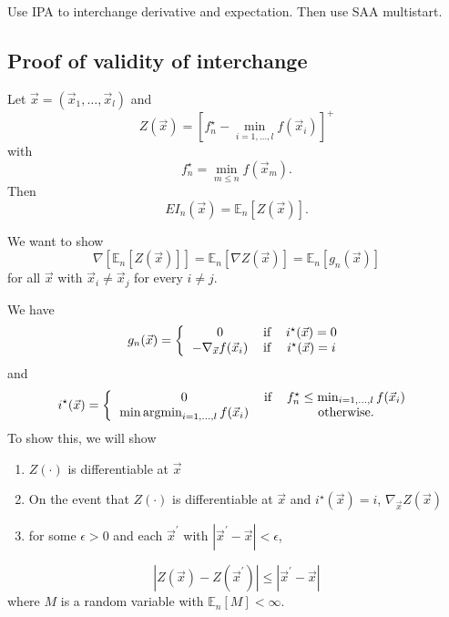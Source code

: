 \documentclass[phd,tocprelim]{cornell}
\DeclareMathOperator*{\argmin}{argmin}
\begin{document}
Use IPA to interchange derivative and expectation. Then use SAA multistart.

\subsection{Proof of validity of interchange}

Let $\vec{x} = \left(\vec{x}_{1}, \ldots, \vec{x}_{l}\right)$ and
\begin{equation}
    Z \left(\vec{x}\right) = \left[f_{n}^{\star} - \min_{i = 1,\ldots,l} f \left(\vec{x}_{i}\right)\right]^{+}
\end{equation}
with
\begin{equation}
    f_{n}^{\star} = \min_{m\leq n} f \left(\vec{x}_{m}\right).
\end{equation}
Then
\begin{equation}
    EI_{n}(\vec{x}) = \mathbb{E}_{n}\left[Z \left(\vec{x}\right)\right].
\end{equation}

We want to show
\begin{equation}
    \nabla \left[\mathbb{E}_{n}\left[Z \left(\vec{x}\right)\right]\right] = \mathbb{E}_{n}\left[\nabla Z \left(\vec{x}\right)\right] =  \mathbb{E}_{n}\left[g_{n}(\vec{x})\right]
\end{equation}
for all $\vec{x}$ with $\vec{x}_{i} \neq \vec{x}_{j}$ for every $i \neq j$.

We have
\begin{equation}
    g_{n}(\vec{x}) = \left\{ \begin{tabular}{ccc}
        0 & if & $i^{\star}(\vec{x}) = 0$ \\
        $-\nabla_{\vec{x}} f(\vec{x}_{i})$ & if & $i^{\star}(\vec{x}) = i$
    \end{tabular} \right.
\end{equation}
and
\begin{equation}
    i^{\star}(\vec{x}) = \left\{ \begin{tabular}{ccc}
        0 & if & $f_{n}^{\star} \leq \min_{i=1,\ldots,l} f(\vec{x}_{i})$ \\
        $\min \argmin_{i=1,\ldots,l} f(\vec{x}_{i})$ & & otherwise.
    \end{tabular} \right.
\end{equation}
To show this, we will show
\begin{enumerate}
    \item $Z(\cdot)$ is differentiable at $\vec{x}$
    \item On the event that $Z(\cdot)$ is differentiable at $\vec{x}$ and $i^{\star}(\vec{x}) = i$, $\nabla_{\vec{x}} Z(\vec{x})$
    \item for some $\epsilon > 0$ and each $\vec{x}^{\prime}$ with $|\vec{x}^{\prime} - \vec{x}| < \epsilon$,
\end{enumerate}
\begin{equation}
    \left|Z(\vec{x}) - Z(\vec{x}^{\prime})\right| \leq \left|\vec{x}^{\prime} - \vec{x}\right|
\end{equation}
where $M$ is a random variable with $\mathbb{E}_{n}\left[M\right] < \infty$.
\end{document}
